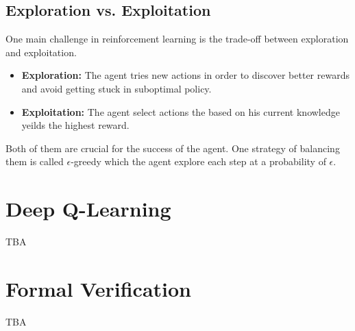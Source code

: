 \documentclass[12pt,a4paper]{report}
\begin{document}
\subsection{Exploration vs. Exploitation}
One main challenge in reinforcement learning is the trade-off between exploration and exploitation.
\begin{itemize}
    \item \textbf{Exploration:} The agent tries new actions in order to discover better rewards and avoid getting stuck in suboptimal policy.
    \item \textbf{Exploitation:} The agent select actions the based on his current knowledge yeilds the highest reward.
\end{itemize}
Both of them are crucial for the success of the agent. One strategy of balancing them is called $\epsilon$-greedy which the agent explore each step at a probability of $\epsilon$.  
\section{Deep Q-Learning}
TBA
\section{Formal Verification}
TBA
\end{document}
